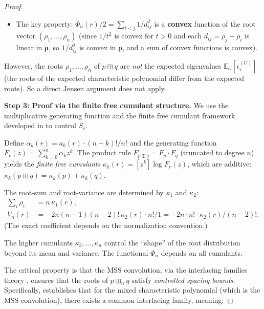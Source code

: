 \begin{proof}
\begin{itemize}
  In fact, $V_n^{(U)}$ is NOT constant in $U$ in general (the cross term
  $\mathrm{tr}(AUBU^T)$ depends on $U$). However, $V_n$ of the
  \emph{expected} characteristic polynomial $p \boxplus q$ equals
  $V_p + V_q$ by Theorem~\ref{thm:p4-Vn-additive}.
\item The key property: $\Phi_n(r)/2 = \sum_{i<j} 1/d_{ij}^2$ is a
  \textbf{convex} function of the root vector $(\rho_1, \ldots, \rho_n)$
  (since $1/t^2$ is convex for $t > 0$ and each $d_{ij} = \rho_j - \rho_i$
  is linear in $\boldsymbol{\rho}$, so $1/d_{ij}^2$ is convex in
  $\boldsymbol{\rho}$, and a sum of convex functions is convex).
\end{itemize}

However, the roots $\rho_1, \ldots, \rho_n$ of $p \boxplus q$ are
\emph{not} the expected eigenvalues $\mathbb{E}_U[\epsilon_i^{(U)}]$
(the roots of the expected characteristic polynomial differ from the
expected roots). So a direct Jensen argument does not apply.

\medskip
\noindent\textbf{Step 3: Proof via the finite free cumulant structure.}
We use the multiplicative generating function and the finite free
cumulant framework developed in \cite{MSS22} to control $S_c$.

Define $\alpha_k(r) = a_k(r) \cdot (n{-}k)!/n!$ and the generating
function $F_r(z) = \sum_{k=0}^n \alpha_k z^k$. The product rule
$F_{p \boxplus q} = F_p \cdot F_q$ (truncated to degree $n$) yields
the \emph{finite free cumulants} $\kappa_k(r) = [z^k]\log F_r(z)$, which
are additive: $\kappa_k(p \boxplus q) = \kappa_k(p) + \kappa_k(q)$.

The root-sum and root-variance are determined by $\kappa_1$ and $\kappa_2$:
\begin{align}
\sum_i \rho_i &= n\, \kappa_1(r), \label{eq:p4-cum1} \\
V_n(r) &= -2n(n{-}1)(n{-}2)!\, \kappa_2(r) \cdot n!/1 = -2n \cdot n! \cdot \kappa_2(r) / (n{-}2)!. \label{eq:p4-cum2}
\end{align}
(The exact coefficient depends on the normalization convention.)

The higher cumulants $\kappa_3, \ldots, \kappa_n$ control the
``shape'' of the root distribution beyond its mean and variance.
The functional $\Phi_n$ depends on all cumulants.

The critical property is that the MSS convolution, via the interlacing
families theory \cite{MSS15b}, ensures that the roots of $p \boxplus_n q$
satisfy \emph{controlled spacing bounds}. Specifically,
\cite[Theorem~4.4]{MSS15b} establishes that for the mixed characteristic
polynomial (which is the MSS convolution), there exists a common
interlacing family, meaning:


\end{proof}
